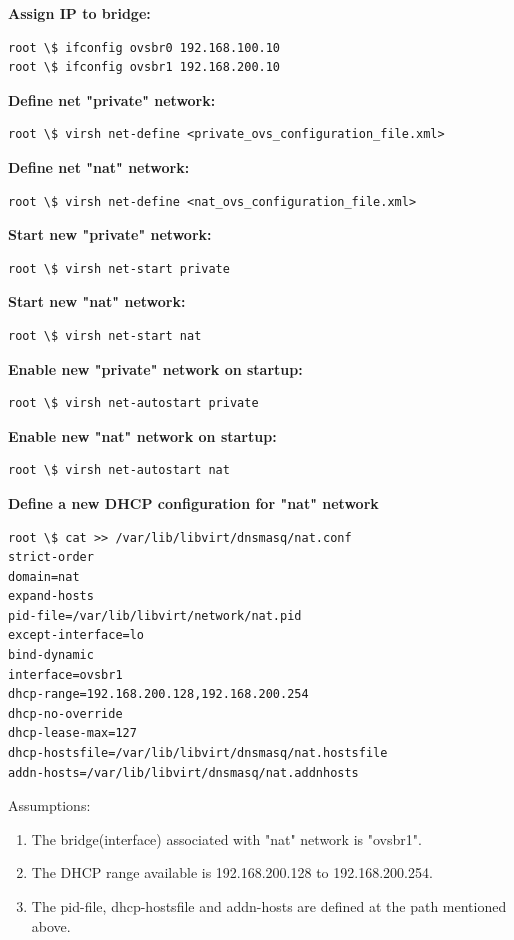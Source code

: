 \documentclass[12pt]{extarticle}
\begin{document}
\begin{enumerate}
\noindent
\textbf{Assign IP to bridge:}
\begin{verbatim}
root \$ ifconfig ovsbr0 192.168.100.10
root \$ ifconfig ovsbr1 192.168.200.10
\end{verbatim}

\noindent
\textbf{Define net "private" network:}
\begin{verbatim}
root \$ virsh net-define <private_ovs_configuration_file.xml>
\end{verbatim}

\noindent
\textbf{Define net "nat" network:}
\begin{verbatim}
root \$ virsh net-define <nat_ovs_configuration_file.xml>
\end{verbatim}

\noindent
\textbf{Start new "private" network:}
\begin{verbatim}
root \$ virsh net-start private
\end{verbatim}


\noindent
\textbf{Start new "nat" network:}
\begin{verbatim}
root \$ virsh net-start nat
\end{verbatim}


\noindent
\textbf{Enable new "private" network on startup:}
\begin{verbatim}
root \$ virsh net-autostart private
\end{verbatim}

\noindent
\textbf{Enable new "nat" network on startup:}
\begin{verbatim}
root \$ virsh net-autostart nat
\end{verbatim}

\noindent
\textbf{Define a new DHCP configuration for "nat" network}
\begin{verbatim}
root \$ cat >> /var/lib/libvirt/dnsmasq/nat.conf
strict-order
domain=nat
expand-hosts
pid-file=/var/lib/libvirt/network/nat.pid
except-interface=lo
bind-dynamic
interface=ovsbr1
dhcp-range=192.168.200.128,192.168.200.254
dhcp-no-override
dhcp-lease-max=127
dhcp-hostsfile=/var/lib/libvirt/dnsmasq/nat.hostsfile
addn-hosts=/var/lib/libvirt/dnsmasq/nat.addnhosts
\end{verbatim}
Assumptions:
\begin{enumerate}
\item The bridge(interface) associated with "nat" network is "ovsbr1".
\item The DHCP range available is 192.168.200.128 to 192.168.200.254.
\item The pid-file, dhcp-hostsfile and addn-hosts are defined at the path mentioned above.
\end{enumerate}


\end{enumerate}
\end{document}
